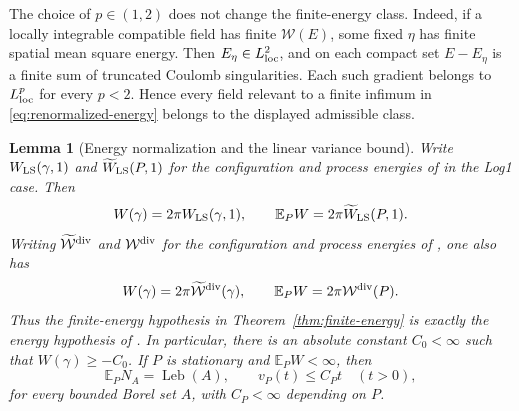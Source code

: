 \documentclass[11pt,reqno]{amsart}
\numberwithin{equation}{section}
\newtheorem{lemma}[theorem]{Lemma}
\theoremstyle{definition}
\theoremstyle{remark}
\newcommand{\E}{\mathbb E}
\newcommand{\1}{\mathbf 1}
\newcommand{\Leb}{\operatorname{Leb}}
\begin{document}
The choice of $p\in(1,2)$ does not change the finite-energy class.
Indeed, if a locally integrable compatible field has finite
$\mathcal W(E)$, some fixed $\eta$ has finite spatial mean square
energy. Then $E_\eta\in L^2_{\rm loc}$, and on each compact set
$E-E_\eta$ is a finite sum of truncated Coulomb singularities. Each
such gradient belongs to $L^p_{\rm loc}$ for every $p<2$. Hence every
field relevant to a finite infimum in \eqref{eq:renormalized-energy}
belongs to the displayed admissible class.

\begin{samepage}
\begin{lemma}[Energy normalization and the linear variance bound]\label{lem:energy-input}
Write $W_{\rm LS}(\gamma,1)$ and $\widetilde W_{\rm LS}(P,1)$ for the
configuration and process energies of \cite[Sections~2.7.3--2.7.4]{LS}
in the Log1 case. Then
\begin{equation}\label{eq:energy-bridge}
W(\gamma)=2\pi W_{\rm LS}(\gamma,1),\qquad
\E_PW=2\pi\widetilde W_{\rm LS}(P,1).
\end{equation}
Writing $\widetilde{\mathcal W}^{\rm div}$ and
$\mathcal W^{\rm div}$ for the configuration and process energies
of \cite[Definitions~2.5--2.6]{Assiotis}, one also has
\begin{equation}\label{eq:assiotis-energy}
W(\gamma)=2\pi\widetilde{\mathcal W}^{\rm div}(\gamma),\qquad
\E_PW=2\pi\mathcal W^{\rm div}(P).
\end{equation}
Thus the finite-energy hypothesis in Theorem~\ref{thm:finite-energy}
is exactly the energy hypothesis of \cite[Theorem~1.1]{Assiotis}.
In particular, there is an absolute constant $C_0<\infty$ such that
$W(\gamma)\ge-C_0$. If $P$ is stationary and $\E_PW<\infty$, then
\begin{equation}\label{eq:energy-linear-conclusion}
\E_PN_A=\Leb(A),\qquad
v_P(t)\le C_Pt\quad(t>0),
\end{equation}
for every bounded Borel set $A$, with $C_P<\infty$ depending on $P$.
\end{lemma}
\end{samepage}
\end{document}
